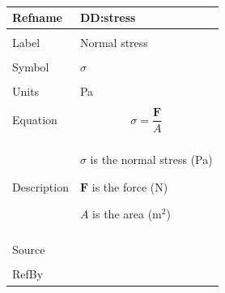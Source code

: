 \documentclass[12pt]{article}
\begin{document}
~\newline
 \noindent \begin{minipage}{\textwidth}
\begin{tabular}{p{} p{}}
\toprule \textbf{Refname} & \textbf{DD:stress}
\label{DD:stress}
\\ \midrule \\
Label & Normal stress
        \\ \midrule \\
        Symbol & $σ$
                 \\ \midrule \\
                 Units & Pa
                         \\ \midrule \\
                         Equation & \begin{displaymath}
                                    σ=\frac{\mathbf{F}}{A}
                                    \end{displaymath}
                                    \\ \midrule \\
                                    Description & \begin{symbDescription}
                                                  \item{$σ$ is the normal stress (Pa)}
                                                  \item{$\mathbf{F}$ is the force (N)}
                                                  \item{$A$ is the area ($\text{m}^{2}$)}
                                                  \end{symbDescription}
                                                  \\ \midrule \\
                                                  Source & \cite{huston2008}
                                                           \\ \midrule \\
                                                           RefBy & 
\\ \bottomrule \end{tabular}
\end{minipage}\\
~\newline
\end{document}
